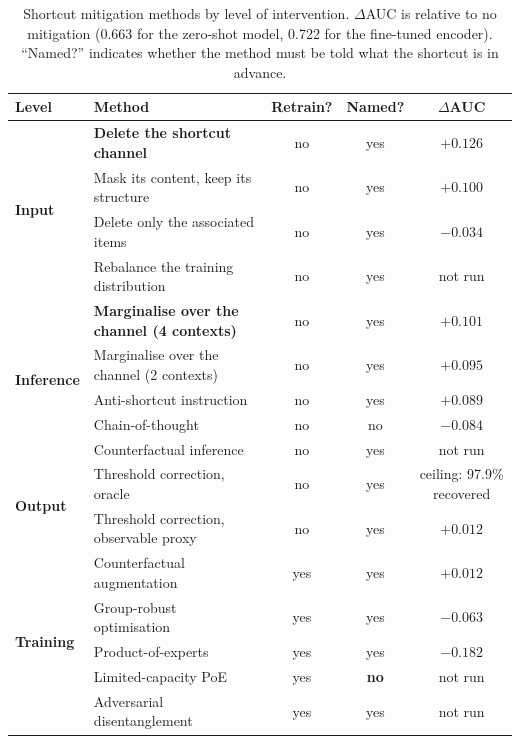 \documentclass{article}
\begin{document}
\begin{table}[t]
\centering
\small
\caption{Shortcut mitigation methods by level of intervention. $\Delta$AUC is
relative to no mitigation (0.663 for the zero-shot model, 0.722 for the
fine-tuned encoder). ``Named?'' indicates whether the method must be told what
the shortcut is in advance.}
\label{tab:taxonomy}
\begin{tabular}{llccc}
\toprule
Level & Method & Retrain? & Named? & $\Delta$AUC \\
\midrule
\multirow{4}{*}{\textbf{Input}}
 & \textbf{Delete the shortcut channel} & no & yes & $\mathbf{+0.126}$ \\
 & Mask its content, keep its structure & no & yes & $+0.100$ \\
 & Delete only the associated items & no & yes & $-0.034$ \\
 & Rebalance the training distribution & no & yes & not run \\
\midrule
\multirow{5}{*}{\textbf{Inference}}
 & \textbf{Marginalise over the channel (4 contexts)} & no & yes & $\mathbf{+0.101}$ \\
 & Marginalise over the channel (2 contexts) & no & yes & $+0.095$ \\
 & Anti-shortcut instruction & no & yes & $+0.089$ \\
 & Chain-of-thought & no & no & $-0.084$ \\
 & Counterfactual inference \citep{wu2025beyond} & no & yes & not run \\
\midrule
\multirow{2}{*}{\textbf{Output}}
 & Threshold correction, oracle & no & yes & ceiling: 97.9\% recovered \\
 & Threshold correction, observable proxy & no & yes & $+0.012$ \\
\midrule
\multirow{5}{*}{\textbf{Training}}
 & Counterfactual augmentation & yes & yes & $+0.012$ \\
 & Group-robust optimisation \citep{sagawa2019groupdro} & yes & yes & $-0.063$ \\
 & Product-of-experts \citep{clark2019poe} & yes & yes & $\mathbf{-0.182}$ \\
 & Limited-capacity PoE \citep{sanh2020lmm} & yes & \textbf{no} & not run \\
 & Adversarial disentanglement \citep{zhang2025interviewerbias} & yes & yes & not run \\
\bottomrule
\end{tabular}
\end{table}
\end{document}
